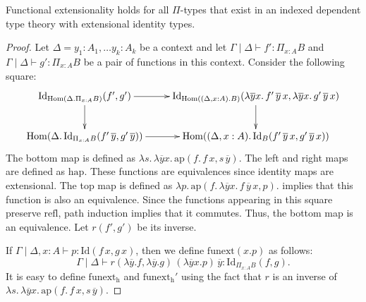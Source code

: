 \documentclass[reqno]{amsart}
\theoremstyle{definition}
\theoremstyle{remark}
\newcommand{\fs}[1]{\mathrm{#1}}
\newcommand{\Hom}{\fs{Hom}}
\newcommand{\Id}{\fs{Id}}
\newcommand{\refl}{\fs{refl}}
\newcommand{\pmap}{\fs{ap}}
\numberwithin{figure}{section}
\begin{document}
\begin{prop}
Functional extensionality holds for all $\Pi$-types that exist in an indexed dependent type theory with extensional identity types.
\end{prop}
\begin{proof}
Let $\Delta = y_1 : A_1, \ldots y_k : A_k$ be a context and let $\Gamma \mid \Delta \vdash f' : \Pi_{x : A} B$ and $\Gamma \mid \Delta \vdash g' : \Pi_{x : A} B$ be a pair of functions in this context.
Consider the following square:
\[ \xymatrix{ \Id_{\Hom(\Delta. \Pi_{x : A} B)}(f',g') \ar[r] \ar[d] & \Id_{\Hom((\Delta, x : A). B)}(\lambda \overline{y} x.\,f'\,\overline{y}\,x, \lambda \overline{y} x.\,g'\,\overline{y}\,x) \ar[d] \\
              \Hom(\Delta.\,\Id_{\Pi_{x : A} B}(f'\,\overline{y}, g'\,\overline{y})) \ar[r] & \Hom((\Delta, x : A).\,\Id_B(f'\,\overline{y}\,x, g'\,\overline{y}\,x))
            } \]
The bottom map is defined as $\lambda s.\,\lambda \overline{y} x.\,\pmap(f.\,f\,x,s\,\overline{y})$.
The left and right maps are defined as $\fs{hap}$.
These functions are equivalences since identity maps are extensional.
The top map is defined as $\lambda p.\,\pmap(f.\,\lambda \overline{y} x.\,f\,\overline{y}\,x,p)$.
 implies that this function is also an equivalence.
Since the functions appearing in this square preserve $\refl$, path induction implies that it commutes.
Thus, the bottom map is an equivalence.
Let $r(f',g')$ be its inverse.

If $\Gamma \mid \Delta, x : A \vdash p : \Id(f\,x,g\,x)$, then we define $\fs{funext}(x.p)$ as follows:
\[ \Gamma \mid \Delta \vdash r(\lambda \overline{y}.f,\lambda \overline{y}.g)\,(\lambda \overline{y} x.p)\,\overline{y} : \Id_{\Pi_{x : A} B}(f,g). \]
It is easy to define $\fs{funext_h}$ and $\fs{funext_h'}$ using the fact that $r$ is an inverse of $\lambda s.\,\lambda \overline{y} x.\,\pmap(f.\,f\,x,s\,\overline{y})$.
\end{proof}
\end{document}
